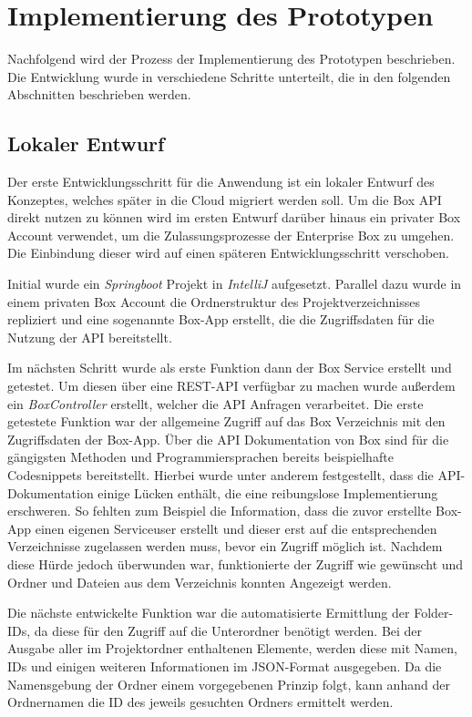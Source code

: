 \section{Implementierung des Prototypen}

Nachfolgend wird der Prozess der Implementierung des Prototypen beschrieben. Die Entwicklung wurde in verschiedene Schritte unterteilt, die in den folgenden Abschnitten beschrieben werden.

\subsection{Lokaler Entwurf}
Der erste Entwicklungsschritt für die Anwendung ist ein lokaler Entwurf des Konzeptes, welches später in die Cloud migriert werden soll. Um die Box \ac{API} direkt nutzen zu können wird im ersten Entwurf darüber hinaus ein privater Box Account verwendet, um die Zulassungsprozesse der Enterprise Box zu umgehen. Die Einbindung dieser wird auf einen späteren Entwicklungsschritt verschoben.

Initial wurde ein \textit{\gls{Springboot}} Projekt in \textit{\gls{IntelliJ}} aufgesetzt. Parallel dazu wurde in einem privaten Box Account die Ordnerstruktur des Projektverzeichnisses repliziert und eine sogenannte Box-App erstellt, die die Zugriffsdaten für die Nutzung der \ac{API} bereitstellt.

Im nächsten Schritt wurde als erste Funktion dann der Box Service erstellt und getestet. Um diesen über eine \ac{REST}-\ac{API} verfügbar zu machen wurde außerdem ein \textit{BoxController} erstellt, welcher die \ac{API} Anfragen verarbeitet. Die erste getestete Funktion war der allgemeine Zugriff auf das Box Verzeichnis mit den Zugriffsdaten der Box-App. Über die \ac{API} Dokumentation von Box sind für die gängigsten Methoden und Programmiersprachen bereits beispielhafte Codesnippets bereitstellt. Hierbei wurde unter anderem festgestellt, dass die \ac{API}-Dokumentation einige Lücken enthält, die eine reibungslose Implementierung erschweren. So fehlten zum Beispiel die Information, dass die zuvor erstellte Box-App einen eigenen Serviceuser erstellt und dieser erst auf die entsprechenden Verzeichnisse zugelassen werden muss, bevor ein Zugriff möglich ist. Nachdem diese Hürde jedoch überwunden war, funktionierte der Zugriff wie gewünscht und Ordner und Dateien aus dem Verzeichnis konnten Angezeigt werden.

Die nächste entwickelte Funktion war die automatisierte Ermittlung der Folder-IDs, da diese für den Zugriff auf die Unterordner benötigt werden. Bei der Ausgabe aller im Projektordner enthaltenen Elemente, werden diese mit Namen, IDs und einigen weiteren Informationen im \ac{JSON}-Format ausgegeben. Da die Namensgebung der Ordner einem vorgegebenen Prinzip folgt, kann anhand der Ordnernamen die ID des jeweils gesuchten Ordners ermittelt werden.

